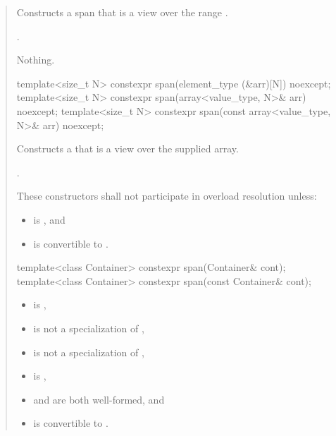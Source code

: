 \documentclass{wg21}
\begin{document}
\begin{quote}
\begin{addedblock}
\begin{itemdescr}
    \pnum
    \effects
    Constructs a span that is a view over the range .

    \pnum
    \ensures
    .

    \pnum
    \throws
    Nothing.


\end{itemdescr}
\end{addedblock}

\begin{itemdecl}
template<size_t N> constexpr span(element_type (&arr)[N]) noexcept;
template<size_t N> constexpr span(array<value_type, N>& arr) noexcept;
template<size_t N> constexpr span(const array<value_type, N>& arr) noexcept;
\end{itemdecl}
\begin{itemdescr}
    \pnum
    \effects
    Constructs a  that is a view over the supplied array.

    \pnum
    \ensures
    .

    \pnum
    \remarks
    These constructors shall not participate in overload resolution unless:
    \begin{itemize}
        \item {} is , and
        \item {} is convertible to .
    \end{itemize}
\end{itemdescr}

\begin{removedblock}
\begin{itemdecl}
template<class Container> constexpr span(Container& cont);
template<class Container> constexpr span(const Container& cont);
\end{itemdecl}

\begin{itemdescr}
\pnum
\constraints
\begin{itemize}
	\item {} is ,
	\item {} is not a specialization of ,
	\item {} is not a specialization of ,
	\item {} is ,
	\item {} and  are both well-formed, and
	\item {} is convertible to .
\end{itemize}


\end{itemdescr}
\end{removedblock}
\end{quote}
\end{document}
